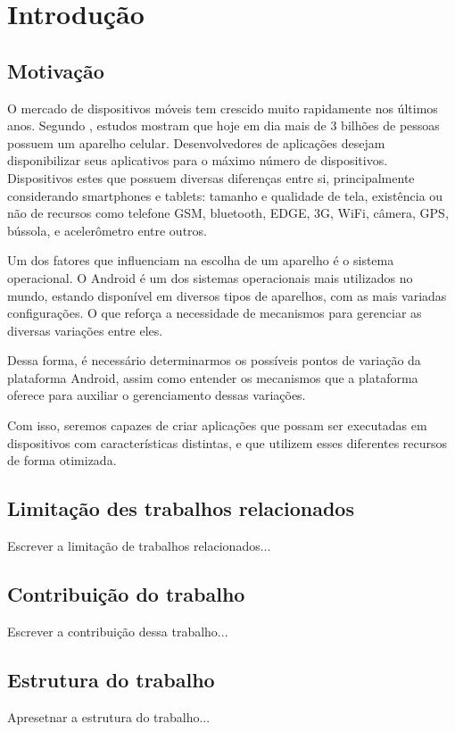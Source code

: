 \chapter{Introdução}

\section{Motivação}
O mercado de dispositivos móveis tem crescido muito rapidamente nos últimos anos.
Segundo \cite{lecheta}, estudos mostram que hoje em dia mais de 3 bilhões de pessoas
possuem um aparelho celular. Desenvolvedores de aplicações desejam disponibilizar
seus aplicativos para o máximo número de dispositivos. Dispositivos estes que
possuem diversas diferenças entre si, principalmente considerando smartphones e
tablets: tamanho e qualidade de tela, existência ou não de recursos como telefone
GSM, bluetooth, EDGE, 3G, WiFi, câmera, GPS, bússola, e acelerômetro entre outros.

Um dos fatores que influenciam na escolha de um aparelho é o sistema operacional.
O Android é um dos sistemas operacionais mais utilizados no mundo, estando 
disponível em diversos tipos de aparelhos, com as mais variadas configurações.
O que reforça a necessidade de mecanismos para gerenciar as diversas variações entre 
eles.

Dessa forma, é necessário determinarmos os possíveis pontos de variação da plataforma
Android, assim como entender os mecanismos que a plataforma oferece para auxiliar
o gerenciamento dessas variações. 

Com isso, seremos capazes de criar aplicações que possam ser executadas em dispositivos
com características distintas, e que utilizem esses diferentes recursos de forma otimizada.

\section{Limitação des trabalhos relacionados}
Escrever a limitação de trabalhos relacionados...

\section{Contribuição do trabalho}
Escrever a contribuição dessa trabalho...

\section{Estrutura do trabalho}
Apresetnar a estrutura do trabalho...
